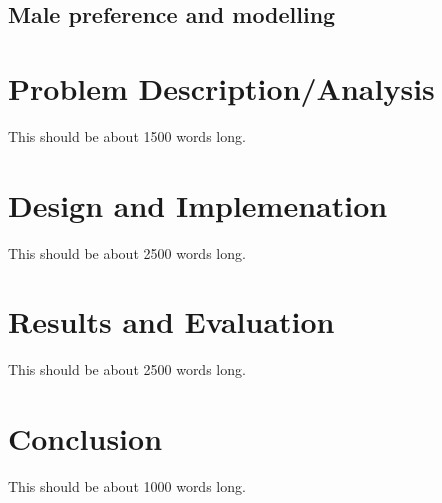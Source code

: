 \documentclass[authoryearcitations]{UoYCSproject}
\begin{document}
\section{Male preference and modelling}

\chapter{Problem Description/Analysis}
\label{cha:Problem Description}
This should be about 1500 words long.

\chapter{Design and Implemenation}
\label{cha:Design and Implementation}
This should be about 2500 words long.

\chapter{Results and Evaluation}
\label{cha:Results and Evaluation}
This should be about 2500 words long.

\chapter{Conclusion}
\label{cha:Conclusion}
This should be about 1000 words long.
\end{document}
